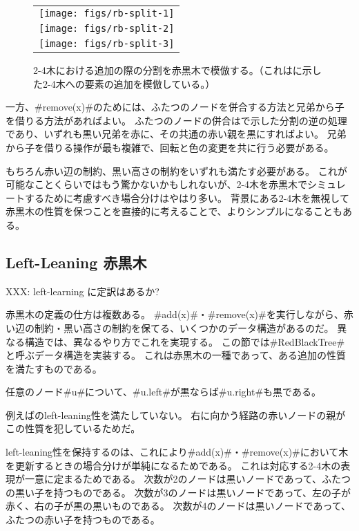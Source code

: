 \begin{figure}
  \begin{center}
   \begin{tabular}{c}
     \texttt{[image: figs/rb-split-1]} \\
     \texttt{[image: figs/rb-split-2]} \\
     \texttt{[image: figs/rb-split-3]} \\
   \end{tabular}
  \end{center}
  \caption{2-4木における追加の際の分割を赤黒木で模倣する。（これはに示した2-4木への要素の追加を模倣している。）}
\end{figure}

一方、#remove(x)#のためには、ふたつのノードを併合する方法と兄弟から子を借りる方法があればよい。
ふたつのノードの併合はで示した分割の逆の処理であり、いずれも黒い兄弟を赤に、その共通の赤い親を黒にすればよい。
兄弟から子を借りる操作が最も複雑で、回転と色の変更を共に行う必要がある。

もちろん赤い辺の制約、黒い高さの制約をいずれも満たす必要がある。
これが可能なことくらいではもう驚かないかもしれないが、2-4木を赤黒木でシミュレートするために考慮すべき場合分けはやはり多い。
背景にある2-4木を無視して赤黒木の性質を保つことを直接的に考えることで、よりシンプルになることもある。

\subsection{Left-Leaning 赤黒木}
XXX: left-learning に定訳はあるか?

%
%
赤黒木の定義の仕方は複数ある。
#add(x)#・#remove(x)#を実行しながら、赤い辺の制約・黒い高さの制約を保てる、いくつかのデータ構造があるのだ。
異なる構造では、異なるやり方でこれを実現する。
この節では#RedBlackTree#と呼ぶデータ構造を実装する。
%
これは赤黒木の一種であって、ある追加の性質を満たすものである。
\begin{prp}
  任意のノード#u#について、#u.left#が黒ならば#u.right#も黒である。
\end{prp}
例えばのleft-leaning性を満たしていない。
右に向かう経路の赤いノードの親がこの性質を犯しているためだ。

left-leaning性を保持するのは、これにより#add(x)#・#remove(x)#において木を更新するときの場合分けが単純になるためである。
これは対応する2-4木の表現が一意に定まるためである。
次数が2のノードは黒いノードであって、ふたつの黒い子を持つものである。
次数が3のノードは黒いノードであって、左の子が赤く、右の子が黒の黒いものである。
次数が4のノードは黒いノードであって、ふたつの赤い子を持つものである。

